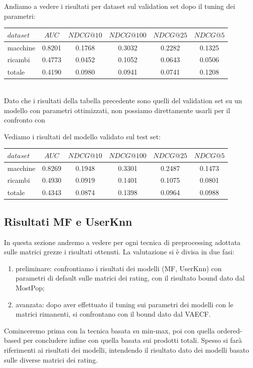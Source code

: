 Andiamo a vedere i risultati per dataset sul validation set dopo il tuning dei parametri:\\

\begin{tabular}{|l|c|cccc|}
    \toprule
    $dataset$ &    $AUC$ &  $NDCG@10$ & $NDCG@100$  & $NDCG@25$ & $NDCG@5$  \\
    \midrule
    macchine & 0.8201 & 0.1768 & 0.3032 & 0.2282 & 0.1325 \\
    ricambi & 0.4773 & 0.0452 & 0.1052 & 0.0643 & 0.0506 \\
    totale  & 0.4190 & 0.0980 & 0.0941 & 0.0741 & 0.1208 \\
\bottomrule
\end{tabular}\\

Dato che i risultati della tabella precedente sono quelli del validation set su un modello con parametri ottimizzati, non possiamo direttamente usarli per il confronto con 

Vediamo i risultati del modello validato sul test set:\\

\begin{tabular}{|l|c|cccc|}
    \toprule
    $dataset$ &    $AUC$ &  $NDCG@10$ & $NDCG@100$  & $NDCG@25$ & $NDCG@5$  \\
    \midrule
    macchine & 0.8269 &  0.1948 &   0.3301 &  0.2487 & 0.1473 \\
    ricambi  & 0.4930 &  0.0919 &   0.1401 &  0.1075 & 0.0801 \\
    totale  & 0.4343 &  0.0874 &   0.1398 &  0.0964 & 0.0988 \\

\bottomrule
\end{tabular}

\subsection{Risultati MF e UserKnn}
In questa sezione andremo a vedere per ogni tecnica di preprocessing adottata sulle matrici grezze i risultati ottenuti.
La valutazione si è divisa in due fasi: 
\begin{enumerate}
    \item preliminare: confrontiamo i risultati dei modelli (MF, UserKnn) con parametri di default sulle matrici dei rating, con il risultato bound dato dal MostPop;
    \item avanzata: dopo aver effettuato il tuning sui parametri dei modelli con le matrici rimanenti, si confrontano con il bound dato dal VAECF. 
\end{enumerate} 
Cominceremo prima con la tecnica basata su min-max, poi con quella ordered-based per concludere infine con quella basata sui prodotti totali. 
Spesso si farà riferimenti ai risultati dei modelli, intendendo il risultato dato dei modelli basato sulle diverse matrici dei rating.

